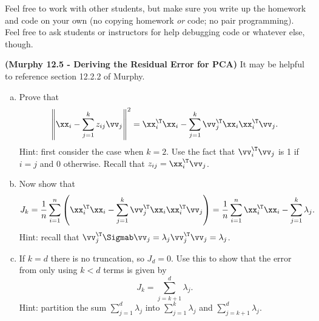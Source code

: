 \documentclass[12pt,letterpaper,fleqn]{hmcpset}
\begin{document}
Feel free to work with other students, but make sure you write up the homework
and code on your own (no copying homework \textit{or} code; no pair programming).
Feel free to ask students or instructors for help debugging code or whatever else,
though.

\begin{problem}[1]
\textbf{(Murphy 12.5 - Deriving the Residual Error for PCA)} It may be helpful to reference
section 12.2.2 of Murphy.
\begin{enumerate}[(a)]
    \item Prove that
        \[
            \left\|\xx_i - \sum_{j=1}^k z_{ij}\vv_j\right\|^2 = \xx_i^\T\xx_i - \sum_{j=1}^k\vv_j^\T \xx_i\xx_i^\T \vv_j.
        \]
        Hint: first consider the case when $k=2$. Use the fact that $\vv_i^\T\vv_j$ is 1 if $i=j$ and 0 otherwise.
        Recall that $z_{ij} = \xx_i^\T\vv_j$.

    \item Now show that
        \[
            J_k = \frac{1}{n}\sum_{i=1}^n \left(\xx_i^\T \xx_i - \sum_{j=1}^k\vv_j^\T \xx_i\xx_i^\T \vv_j\right) = \frac{1}{n}\sum_{i=1}^n \xx_i^\T\xx_i - \sum_{j=1}^k\lambda_j.
        \]
        Hint: recall that $\vv_j^\T \Sigmab \vv_j = \lambda_j\vv_j^\T\vv_j = \lambda_j$.

    \item If $k=d$ there is no truncation, so $J_d=0$. Use this to show that the error from only using $k<d$
        terms is given by
        \[
            J_k = \sum_{j=k+1}^d \lambda_j.
        \]
        Hint: partition the sum $\sum_{j=1}^d \lambda_j$ into $\sum_{j=1}^k \lambda_j$ and $\sum_{j=k+1}^d \lambda_j$.
\end{enumerate}
\end{problem}
\end{document}
